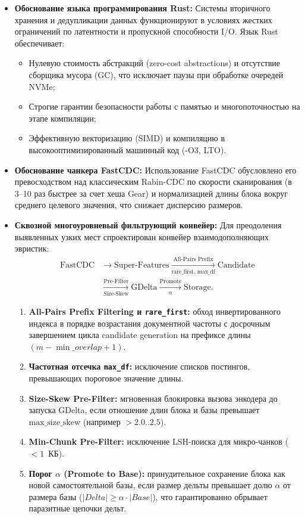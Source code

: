 \documentclass[a4paper,14pt]{extarticle}
\begin{document}
\begin{itemize}
    \item \textbf{Обоснование языка программирования Rust:}
    Системы вторичного хранения и дедупликации данных функционируют в условиях жестких ограничений по латентности и пропускной способности I/O. Язык Rust обеспечивает:
    \begin{itemize}
        \item Нулевую стоимость абстракций (zero-cost abstractions) и отсутствие сборщика мусора (GC), что исключает паузы при обработке очередей NVMe;
        \item Строгие гарантии безопасности работы с памятью и многопоточностью на этапе компиляции;
        \item Эффективную векторизацию (SIMD) и компиляцию в высокооптимизированный машинный код (-O3, LTO).
    \end{itemize}

    \item \textbf{Обоснование чанкера FastCDC:}
    Использование FastCDC обусловлено его превосходством над классическим Rabin-CDC по скорости сканирования (в 3--10 раз быстрее за счет хеша Gear) и нормализацией длины блока вокруг среднего целевого значения, что снижает дисперсию размеров.

    \item \textbf{Сквозной многоуровневый фильтрующий конвейер:}
    Для преодоления выявленных узких мест спроектирован конвейер взаимодополняющих эвристик:
    \begin{align}
        \text{FastCDC} &\longrightarrow \text{Super-Features} \xrightarrow[\text{rare\_first, max\_df}]{\text{All-Pairs Prefix}} \text{Candidate} \nonumber \\
        &\xrightarrow[\text{Size-Skew}]{\text{Pre-Filter}} \text{GDelta} \xrightarrow[\alpha]{\text{Promote}} \text{Storage}.
    \end{align}
    \begin{enumerate}
        \item \textbf{All-Pairs Prefix Filtering и \texttt{rare\_first}:} обход инвертированного индекса в порядке возрастания документной частоты с досрочным завершением цикла candidate generation на префиксе длины $(m - \min\_overlap + 1)$.
        \item \textbf{Частотная отсечка \texttt{max\_df}:} исключение списков постингов, превышающих пороговое значение длины.
        \item \textbf{Size-Skew Pre-Filter:} мгновенная блокировка вызова энкодера до запуска GDelta, если отношение длин блока и базы превышает $\text{max\_size\_skew}$ (например $> 2.0..2.5$).
        \item \textbf{Min-Chunk Pre-Filter:} исключение LSH-поиска для микро-чанков ($< 1$~КБ).
        \item \textbf{Порог $\alpha$ (Promote to Base):} принудительное сохранение блока как новой самостоятельной базы, если размер дельты превышает долю $\alpha$ от размера базы ($|Delta| \ge \alpha \cdot |Base|$), что гарантированно обрывает паразитные цепочки дельт.
    \end{enumerate}
\end{itemize}
\end{document}

